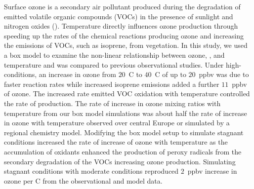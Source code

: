 Surface ozone is a secondary air pollutant produced during the degradation of emitted volatile organic compounds (VOCs) in the presence of sunlight and nitrogen oxides (). 
Temperature directly influences ozone production through speeding up the rates of the chemical reactions producing ozone and increasing the emissions of VOCs, such as isoprene, from vegetation.
In this study, we used a box model to examine the non-linear relationship between ozone, , and temperature and was compared to previous observational studies.
Under high- conditions, an increase in ozone from $20$~\degree C to $40$~\degree C of up to $20$~ppbv was due to faster reaction rates while increased isoprene emissions added a further $11$~ppbv of ozone.
The increased rate emitted VOC oxidation with temperature controlled the rate of  production.
The rate of increase in ozone mixing ratios with temperature from our box model simulations was about half the rate of increase in ozone with temperature observed over central Europe or simulated by a regional chemistry model.
Modifying the box model setup to simulate stagnant conditions increased the rate of increase of ozone with temperature as the accumulation of oxidants enhanced the production of peroxy radicals from the secondary degradation of the VOCs increasing ozone production.
Simulating stagnant conditions with moderate  conditions reproduced $2$~ppbv increase in ozone per \degree C from the observational and model data.
